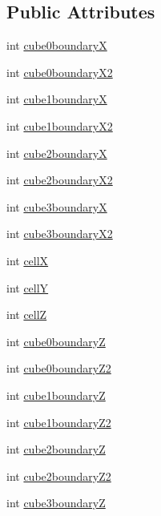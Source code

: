 \subsection*{Public Attributes}
\begin{DoxyCompactItemize}
\item 
int \hyperlink{classl_shape_opp_a8604c36ae3e6b6f6db19fbbb590f46ba}{cube0boundary\-X}
\item 
int \hyperlink{classl_shape_opp_a1584503f7aac34030f0008baac89927e}{cube0boundary\-X2}
\item 
int \hyperlink{classl_shape_opp_aafeb6b7a4003331e6ae1bf820682559e}{cube1boundary\-X}
\item 
int \hyperlink{classl_shape_opp_a8da42a4b9c13d36899a84c9c62e066aa}{cube1boundary\-X2}
\item 
int \hyperlink{classl_shape_opp_a9771f0ea1b5d4205170556bb32a4286f}{cube2boundary\-X}
\item 
int \hyperlink{classl_shape_opp_ae67737706da52a9b065aeec1360b33a8}{cube2boundary\-X2}
\item 
int \hyperlink{classl_shape_opp_a21f68444475a0826de7bef710b700230}{cube3boundary\-X}
\item 
int \hyperlink{classl_shape_opp_af3075944e36c92a7d8c4f7c894446b70}{cube3boundary\-X2}
\item 
int \hyperlink{classl_shape_opp_a68f2d97b3f79fc3f942f08ffb925ab04}{cell\-X}
\item 
int \hyperlink{classl_shape_opp_a45d07e647c16b8c13e03bbe72011487c}{cell\-Y}
\item 
int \hyperlink{classl_shape_opp_a3d1c6dfb9ca0b54c9a44f12adbc52186}{cell\-Z}
\item 
int \hyperlink{classl_shape_opp_a270c01126b5374b2898aec1e8422a427}{cube0boundary\-Z}
\item 
int \hyperlink{classl_shape_opp_a6398c8aa24f758c51dc216fdc0edbab3}{cube0boundary\-Z2}
\item 
int \hyperlink{classl_shape_opp_aa09841484e4e01251b5c426e463de02c}{cube1boundary\-Z}
\item 
int \hyperlink{classl_shape_opp_aadfb455f2af083b1cf6d4a64188766db}{cube1boundary\-Z2}
\item 
int \hyperlink{classl_shape_opp_a52fcc6503edb002e11cfa955df123d15}{cube2boundary\-Z}
\item 
int \hyperlink{classl_shape_opp_add65476fb1d578e1322a7d6c615a84a3}{cube2boundary\-Z2}
\item 
int \hyperlink{classl_shape_opp_a29e8e0ed3f39a3ce64d23d7b24950e6c}{cube3boundary\-Z}

\end{DoxyCompactItemize}
